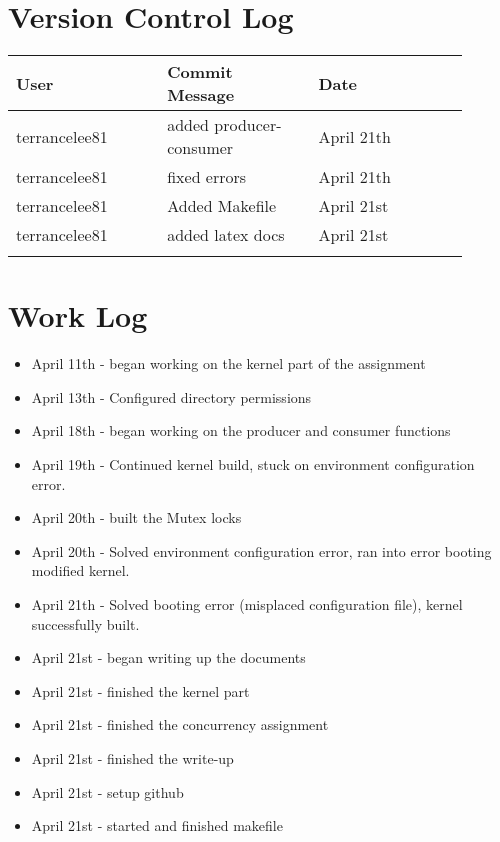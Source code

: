 \documentclass[draftclsnofoot,onecolumn,10pt,compsoc]{IEEEtran}
\begin{document}
\section{Version Control Log}
\begin{center}
	\begin{tabular}{| p{0.3\linewidth} | p{0.3\linewidth} | p{0.3\linewidth} |}
		\hline User & Commit Message & Date\\
		\hline terrancelee81 & added producer-consumer& April 21th\\
		\hline terrancelee81 & fixed errors & April 21th\\
		\hline terrancelee81 & Added Makefile & April 21st\\
		\hline terrancelee81 & added latex docs& April 21st\\
		\hline &&\\		
	\end{tabular}
\end{center}
\section{Work Log}
\begin{itemize}
	\item April 11th - began working on the kernel part of the assignment
	\item April 13th - Configured directory permissions
	\item April 18th - began working on the producer and consumer functions
	\item April 19th - Continued kernel build, stuck on environment configuration error.
	\item April 20th - built the Mutex locks
	\item April 20th - Solved environment configuration error, ran into error booting modified kernel.
	\item April 21th - Solved booting error (misplaced configuration file), kernel successfully built.
	\item April 21st - began writing up the documents
	\item April 21st - finished the kernel part
	\item April 21st - finished the concurrency assignment
	\item April 21st - finished the write-up
	\item April 21st - setup github
	\item April 21st - started and finished makefile
\end{itemize}
\end{document}
